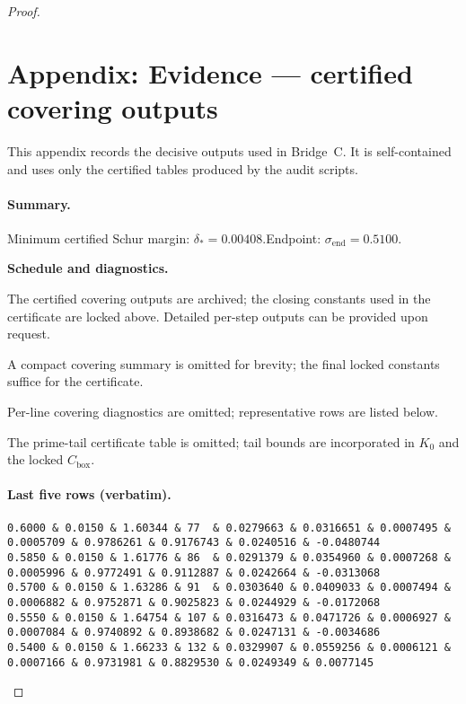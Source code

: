 \documentclass[11pt]{article}
\theoremstyle{definition}
\theoremstyle{remark}
\begin{document}
\begin{proof}
\section*{Appendix: Evidence — certified covering outputs}\label{app:evidence}
\noindent This appendix records the decisive outputs used in Bridge~C. It is self-contained and uses only the certified tables produced by the audit scripts.

\newcommand{\deltaStar}{0.00408}
\newcommand{\sigmaEnd}{0.5100}

\paragraph{Summary.}
Minimum certified Schur margin: \(\delta_* = \deltaStar\).\quad Endpoint: \(\sigma_{\mathrm{end}} = \sigmaEnd\).

\medskip
\noindent\textbf{Schedule and diagnostics.}

% 
\noindent The certified covering outputs are archived; the closing constants used in the certificate are locked above. Detailed per-step outputs can be provided upon request.

% 
\noindent A compact covering summary is omitted for brevity; the final locked constants suffice for the certificate.

% 
\noindent Per-line covering diagnostics are omitted; representative rows are listed below.

% 
\noindent The prime-tail certificate table is omitted; tail bounds are incorporated in $K_0$ and the locked $C_{\mathrm{box}}$.

\paragraph{Last five rows (verbatim).}
{\tiny
\begin{verbatim}
0.6000 & 0.0150 & 1.60344 & 77  & 0.0279663 & 0.0316651 & 0.0007495 & 0.0005709 & 0.9786261 & 0.9176743 & 0.0240516 & -0.0480744 
0.5850 & 0.0150 & 1.61776 & 86  & 0.0291379 & 0.0354960 & 0.0007268 & 0.0005996 & 0.9772491 & 0.9112887 & 0.0242664 & -0.0313068 
0.5700 & 0.0150 & 1.63286 & 91  & 0.0303640 & 0.0409033 & 0.0007494 & 0.0006882 & 0.9752871 & 0.9025823 & 0.0244929 & -0.0172068 
0.5550 & 0.0150 & 1.64754 & 107 & 0.0316473 & 0.0471726 & 0.0006927 & 0.0007084 & 0.9740892 & 0.8938682 & 0.0247131 & -0.0034686 
0.5400 & 0.0150 & 1.66233 & 132 & 0.0329907 & 0.0559256 & 0.0006121 & 0.0007166 & 0.9731981 & 0.8829530 & 0.0249349 & 0.0077145 
\end{verbatim}
}


\end{proof}
\end{document}
